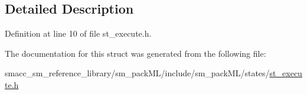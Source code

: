 \subsection{Detailed Description}


Definition at line 10 of file st\+\_\+execute.\+h.



The documentation for this struct was generated from the following file\+:\begin{DoxyCompactItemize}
\item 
smacc\+\_\+sm\+\_\+reference\+\_\+library/sm\+\_\+pack\+M\+L/include/sm\+\_\+pack\+M\+L/states/\hyperlink{st__execute_8h}{st\+\_\+execute.\+h}\end{DoxyCompactItemize}
